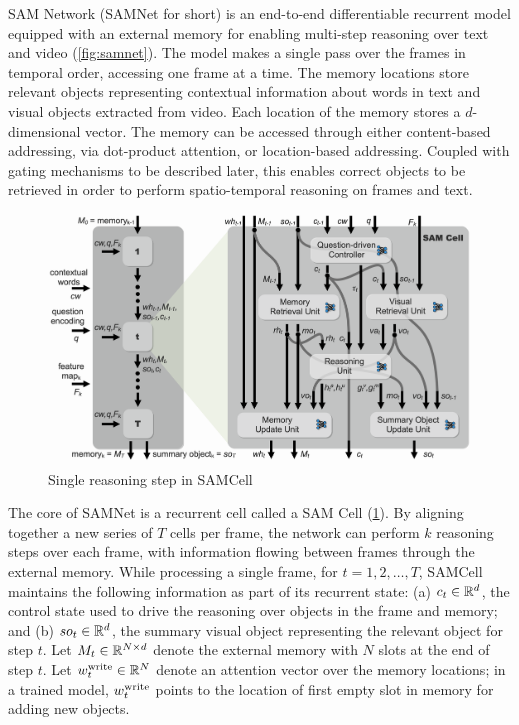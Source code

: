 SAM Network (SAMNet for short) is an end-to-end differentiable recurrent model equipped with an external memory for enabling multi-step reasoning over text and video (\cref{fig:samnet}).
The model makes a single pass over the frames in temporal order, accessing one frame at a time.
The memory locations store relevant objects representing contextual information about words in text and visual objects extracted from video. 
Each location of the memory stores a $d$-dimensional vector. %
The memory  can be accessed through either content-based addressing, via dot-product attention, or location-based addressing. 
Coupled with gating mechanisms to be described later, this enables correct objects to be retrieved 
in order to perform spatio-temporal reasoning on frames and text. 

\begin{figure}[hbtp]
	\centering
	\includegraphics[width=\textwidth]{../img/architecture/samcell_reasoning}
	\caption{Single reasoning step in SAMCell}
	\label{fig:samcell}
\end{figure}	

The core of SAMNet is a recurrent cell called a SAM Cell (\cref{fig:samcell}). 
By aligning together a new series of $T$ cells per frame, the network can perform $k$ 
reasoning steps over each frame, with information flowing between frames through the external memory. 
While processing a single frame, for $t=1,2, \dots, T$, SAMCell maintains the following information as part of its recurrent state:
(a) $c_t \in \mathbb{R}^d$, the control state used to drive the reasoning over objects in the frame and memory; and
(b) $so_t  \in \mathbb{R}^d$, the summary visual object representing the relevant object for step $t$.
Let $M_t \in  \mathbb{R}^{N \times d}$ denote the external memory with $N$ slots at the end of step $t$.
Let $w^{\mathrm{write}}_t \in  \mathbb{R}^N$ denote an attention vector over the memory locations;
in a trained model, $w^{\mathrm{write}}_t$ points to the location of first empty slot in memory for adding new objects.   

